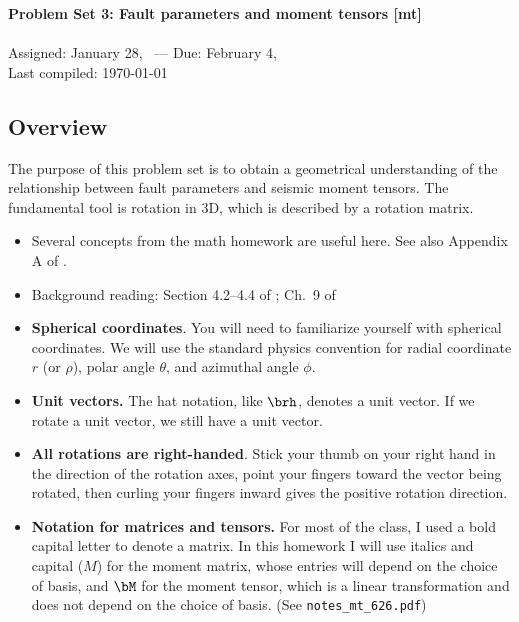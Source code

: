 \documentclass[11pt,titlepage,fleqn]{article}
\begin{document}

\begin{spacing}{1.2}
\centering
{\large \bf Problem Set 3: Fault parameters and moment tensors [mt]} \\
\cltag\ \\
Assigned: January 28, \cyear\ --- Due: February 4, \cyear\ \\
Last compiled: \today
\end{spacing}

\begin{spacing}{1.0}

\subsection*{Overview}

The purpose of this problem set is to obtain a geometrical understanding of the relationship between fault parameters and seismic moment tensors. The fundamental tool is rotation in 3D, which is described by a rotation matrix.

\begin{itemize}
\item Several concepts from the math homework are useful here. See also Appendix A of \citet{SteinWysession}.

\item Background reading: Section 4.2--4.4 of \citet{SteinWysession}; Ch.~9 of \citet{ShearerE2}

\item {\bf Spherical coordinates}. You will need to familiarize yourself with spherical coordinates. We will use the standard physics convention for radial coordinate $r$ (or $\rho$), polar angle $\theta$, and azimuthal angle $\phi$.

\item {\bf Unit vectors.} The hat notation, like $\brh$, denotes a unit vector. If we rotate a unit vector, we still have a unit vector.

\item {\bf All rotations are right-handed}. Stick your thumb on your right hand in the direction of the rotation axes, point your fingers toward the vector being rotated, then curling your fingers inward gives the positive rotation direction.

\item {\bf Notation for matrices and tensors.} For most of the class, I used a bold capital letter to denote a matrix. In this homework I will use italics and capital ($M$) for the moment matrix, whose entries will depend on the choice of basis, and $\bM$ for the moment tensor, which is a linear transformation and does not depend on the choice of basis. (See \verb+notes_mt_626.pdf+)


\end{itemize}
\end{spacing}
\end{document}
